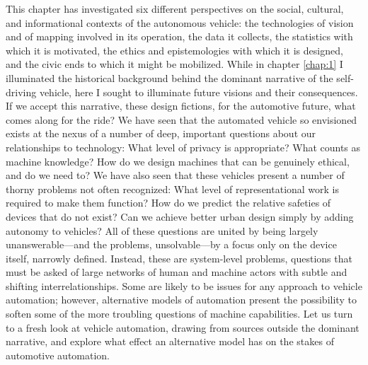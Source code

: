 This chapter has investigated six different perspectives on the
social, cultural, and informational contexts of the autonomous
vehicle:  the technologies of vision and of mapping involved
in its operation, the 
data it collects, the statistics with which it is motivated, the
ethics and epistemologies with which it is designed, and the civic
ends to which it might be mobilized. While in chapter \ref{chap:1} I
illuminated the historical background behind the dominant narrative of
the self-driving vehicle, here I sought to illuminate future visions
and their
consequences. If we accept this narrative, these design
fictions, for the automotive future, what comes along for the ride? We
have seen that the automated vehicle so envisioned exists at the
nexus of a number of deep, important questions about our relationships
to technology: What level of privacy is appropriate? What counts as machine
knowledge? How do we design machines that can be genuinely ethical,
and do we need to? We have also seen that these vehicles present a
number of thorny problems not often recognized: What level of
representational work is required to make them function? How do we
predict the relative safeties of devices that do not exist? Can we
achieve better urban design simply by adding autonomy to vehicles?
All of these questions are united by being largely unanswerable---and
the problems, unsolvable---by a focus only on the device itself,
narrowly defined. Instead, these are system-level problems, questions
that must be asked of large networks of human and machine actors with
subtle and shifting interrelationships. Some are likely to be issues
for any approach to vehicle automation; however, alternative models of
automation present the possibility to soften some of the more
troubling questions of machine capabilities. Let us turn to a fresh look at
vehicle automation, drawing from sources outside the dominant
narrative, and explore what effect an alternative model has on the
stakes of automotive automation.

